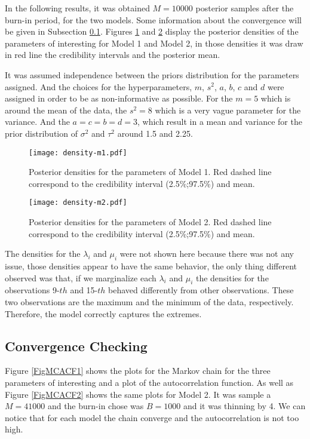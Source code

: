 \documentclass{asaproc}
\begin{document}
In the following results, it was obtained $M = 10000$ posterior samples after the burn-in period, for the two models. Some information about the convergence will be given in Subsection \ref{convergence}. Figures \ref{FigDM1} and \ref{FigDM2} display the posterior densities of the parameters of interesting for Model 1 and Model 2, in those densities it was draw in red line the credibility intervals and the posterior mean.

It was assumed independence between the priors distribution for the parameters assigned. And the choices for the hyperparameters, $m$, $s^2$, $a$, $b$, $c$ and $d$ were assigned in order to be as non-informative as possible. For the $m = 5$ which is around the mean of the data, the $s^2=8$ which is a very vague parameter for the variance. And the $a=c=b=d=3$, which result in a mean and variance for the prior distribution of $\sigma^2$ and $\tau^2$ around 1.5 and 2.25.

\begin{figure}[H]
\centering
\texttt{[image: density-m1.pdf]}
\caption{Posterior densities for the parameters of Model 1. Red dashed line correspond to the credibility interval (2.5\%;97.5\%) and mean.}
\label{FigDM1}
\end{figure}

\begin{figure}[H]
\centering
\texttt{[image: density-m2.pdf]}
\caption{Posterior densities for the parameters of Model 2. Red dashed line correspond to the credibility interval (2.5\%;97.5\%) and mean.}
\label{FigDM2}
\end{figure}

The densities for the $\lambda_i$ and $\mu_i$ were not shown here because there was not any issue, those densities appear to have the same behavior, the only thing different observed was that, if we marginalize each $\lambda_i$ and $\mu_i$ the densities for the observations 9-$th$ and 15-$th$ behaved differently from other observations. These two observations are the maximum and the minimum of the data, respectively. Therefore, the model correctly captures the extremes.

\subsection{Convergence Checking}\label{convergence}

Figure \ref{FigMCACF1} shows the plots for the Markov chain for the three parameters of interesting and a plot of the autocorrelation function. As well as Figure \ref{FigMCACF2} shows the same plots for Model 2. It was sample a $M = 41000$ and the burn-in chose was $B = 1000$ and it was thinning by 4. We can notice that for each model the chain converge and the autocorrelation is not too high.
\end{document}
